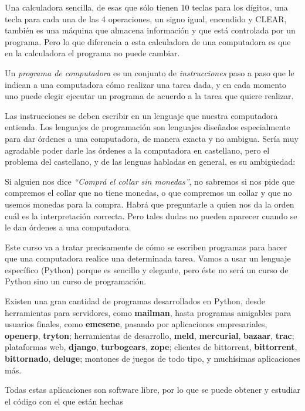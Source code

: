 Una calculadora sencilla, de esas que sólo tienen 10 teclas para
los dígitos, una tecla para cada una de las 4 operaciones, un
signo igual, encendido y CLEAR, también es una máquina que
almacena información y que está controlada por un programa. Pero
lo que diferencia a esta calculadora de una computadora es que en
la calculadora el programa no puede cambiar.

Un {\it programa de computadora} es un conjunto de {\it
instrucciones} paso a paso que le indican a una computadora cómo
realizar una tarea dada, y en cada momento uno puede elegir
ejecutar un programa de acuerdo a la tarea que quiere realizar.

Las instrucciones se deben escribir en un lenguaje que nuestra
computadora entienda. Los lenguajes de programación son
lenguajes diseñados especialmente para dar
órdenes a una computadora, de manera exacta y no ambigua. Sería
muy agradable poder darle las órdenes a la computadora en
castellano, pero el problema del castellano, y de las lenguas
habladas en general, es su ambigüedad:

Si alguien nos dice {\it ``Comprá el collar sin monedas''}, no sabremos
si nos pide que compremos el collar que no tiene monedas, o que compremos
un collar y que no usemos monedas para la compra. Habrá que preguntarle
a quien nos da la orden cuál es la interpretación correcta. Pero tales
dudas no pueden aparecer cuando se le dan órdenes a una computadora.

Este curso va a tratar precisamente de cómo se escriben programas
para hacer que una computadora realice una determinada tarea.
Vamos a usar un lenguaje específico (Python) porque es sencillo y
elegante, pero éste no será un curso de Python sino un curso de
programación.

\begin{sabias_que}
Existen una gran cantidad de programas desarrollados en Python, desde
herramientas para servidores, como {\bf mailman}, hasta programas amigables
para usuarios finales, como {\bf emesene}, pasando por aplicaciones
empresariales, {\bf openerp}, {\bf tryton}; herramientas de desarrollo,
{\bf meld}, {\bf mercurial}, {\bf bazaar}, {\bf trac}; plataformas web,
{\bf django}, {\bf turbogears}, {\bf zope}; clientes de bittorrent, {\bf
bittorrent}, {\bf bittornado}, {\bf deluge}; montones de juegos de todo
tipo, y muchísimas aplicaciones más.

Todas estas aplicaciones son software libre, por lo que se puede obtener y
estudiar el código con el que están hechas
\end{sabias_que}

